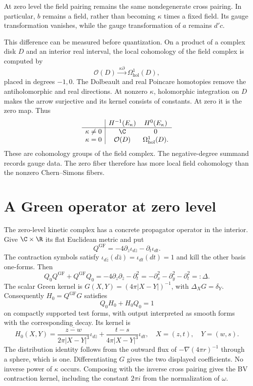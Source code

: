 At zero level the field pairing remains the same nondegenerate cross
pairing.  In particular, $b$ remains a field, rather than becoming
$\kappa$ times a fixed field.  Its gauge transformation vanishes,
while the gauge transformation of $a$ remains $d'c$.

This difference can be measured before quantization.  On a product
of a complex disk $D$ and an interior real interval, the local
cohomology of the field complex is computed by
\[
 \mathcal O(D)\xrightarrow{\ \kappa\partial\ }
 \Omega^1_{\mathrm{hol}}(D),
\]
placed in degrees $-1,0$.  The Dolbeault and real Poincare homotopies
remove the antiholomorphic and real directions.  At nonzero $\kappa$,
holomorphic integration on $D$ makes the arrow surjective and its
kernel consists of constants.  At zero it is the zero map.  Thus
\[
\begin{array}{c|cc}
 &H^{-1}(E_\kappa)&H^0(E_\kappa)\\\hline
 \kappa\ne0&\C&0\\
 \kappa=0&\mathcal O(D)&\Omega^1_{\mathrm{hol}}(D).
\end{array}
\]
These are cohomology groups of the field complex.  The negative-degree
summand records gauge data.  The zero fiber therefore has more local
field cohomology than the nonzero Chern--Simons fibers.

\section{A Green operator at zero level}

The zero-level kinetic complex has a concrete propagator operator in
the interior.  Give $\C\times\R$ its flat Euclidean metric and put
\[
 Q^{\mathrm{GF}}=-4\partial_z\iota_{d\bar z}
                         -\partial_t\iota_{dt}.
\]
The contraction symbols satisfy
$\iota_{d\bar z}(d\bar z)=\iota_{dt}(dt)=1$ and kill the other
basis one-forms.  Then
\[
 Q_0Q^{\mathrm{GF}}+Q^{\mathrm{GF}}Q_0
 =-4\partial_z\partial_{\bar z}-\partial_t^2
 =-\partial_x^2-\partial_y^2-\partial_t^2=:\Delta.
\]
The scalar Green kernel is
$G(X,Y)=(4\pi|X-Y|)^{-1}$, with $\Delta_XG=\delta_Y$.
Consequently $H_0=Q^{\mathrm{GF}}G$ satisfies
\[
 Q_0H_0+H_0Q_0=1
\]
on compactly supported test forms, with output interpreted as smooth
forms with the corresponding decay.  Its kernel is
\[
 H_0(X,Y)=
 \frac{\overline{z-w}}{2\pi|X-Y|^3}\iota_{d\bar z}
 +\frac{t-s}{4\pi|X-Y|^3}\iota_{dt},
 \quad X=(z,t),\quad Y=(w,s).
\]
The distribution identity follows from the outward flux of
$-\nabla(4\pi r)^{-1}$ through a sphere, which is one.
Differentiating $G$ gives the two displayed coefficients.
No inverse power of $\kappa$ occurs.  Composing with the inverse
cross pairing gives the BV contraction kernel, including the constant
$2\pi i$ from the normalization of $\omega$.

